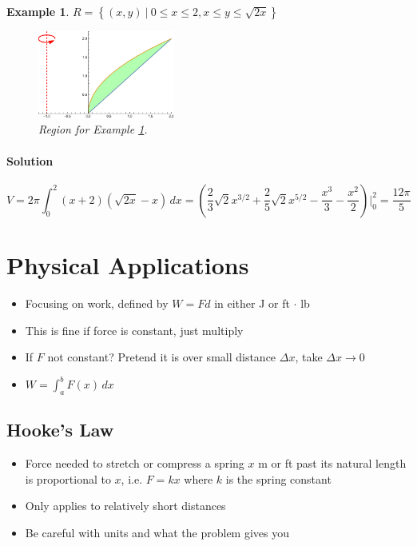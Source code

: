 \documentclass[letterpaper, 11pt, openany]{book}
\theoremstyle{mytheoremstyle}
\theoremstyle{myexamplestyle}
\newtheorem{example}{Example}[section]
\newenvironment{solution}{\paragraph{\sffamily \smaller \fontseries{b}\selectfont Solution}}{\hfill\faSquare}
\begin{document}
\begin{example}
    \label{e:vol-shell-two-func-height}
    \(R = \left\{ (x,y) \ | \ 0 \leq x \leq 2, x \leq y \leq \sqrt{2x} \right\}\)
    \begin{figure}[htbp]
        \centering
            \includegraphics[width=0.4\textwidth]{Figures/volshtwofunc.pdf}
        \caption{Region for Example \ref{e:vol-shell-two-func-height}.}
        \label{f:vol-shell-two-func-height}
    \end{figure}
    \begin{solution}
        \[V = 2\pi \int_{0}^{2} (x + 2)(\sqrt{2x} - x) \, dx =  \left(\frac{2}{3} \sqrt{2} x^{3/2}+\frac{2}{5} \sqrt{2} x^{5/2}-\frac{x^3}{3}-\frac{x^2}{2}\right)\Bigg|_{0}^{2} = \frac{12\pi}{5}\]
    \end{solution}
\end{example}


\section{Physical Applications}
\setcounter{figure}{0}
\begin{itemize}
    \item Focusing on work, defined by $W = Fd$ in either J or ft $\cdot$ lb
    \item This is fine if force is constant, just multiply
    \item If $F$ not constant? Pretend it is over small distance $\Delta x$, take $\Delta x \to 0$
    \item $\displaystyle W = \int_{a}^{b} F(x) \, dx$
\end{itemize}

\subsection{Hooke's Law}
\begin{itemize}
    \item Force needed to stretch or compress a spring $x$ m or ft past its natural length is proportional to $x$, i.e. $F = kx$ where $k$ is the spring constant
    \item Only applies to relatively short distances
    \item Be careful with units and what the problem gives you
\end{itemize}
\end{document}
